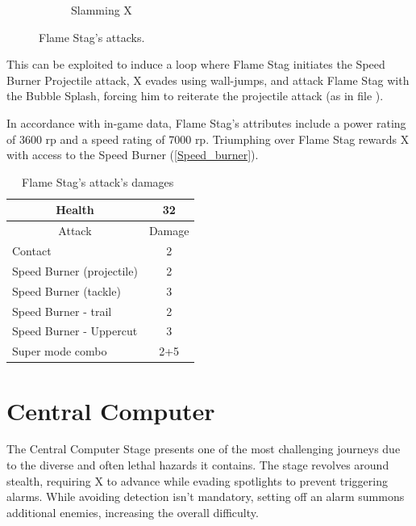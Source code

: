 \begin{figure}
\begin{subfigure}{0.25\linewidth}
		\caption{Slamming X}
	\end{subfigure}
	\caption{Flame Stag's attacks.}
\end{figure}This can be exploited to induce a loop where Flame Stag initiates the Speed Burner Projectile attack, X evades using wall-jumps, and attack Flame Stag with the Bubble Splash, forcing him to reiterate the projectile attack (as in file ).

In accordance with in-game data, Flame Stag's attributes include a power rating of 3600 rp and a speed rating of 7000 rp. Triumphing over Flame Stag rewards X with access to the Speed Burner (\ref{Speed_burner}).

\begin{table}[htp]
	\centering
	\begin{tabular}[h]{l c}
		
		\toprule
		\multicolumn{1}{c}{Health}  & 32 \\
		\midrule
		\multicolumn{1}{c}{Attack} & \multicolumn{1}{c}{Damage}\\
		Contact & 2 \\
		Speed Burner (projectile)& 2\\
		Speed Burner (tackle)& 3\\
		Speed Burner - trail& 2\\
		Speed Burner - Uppercut& 3\\
		Super mode combo & 2+5\\
		\bottomrule
	\end{tabular}
	\caption{Flame Stag's attack's damages~\cite{wiki:Flame_stag,book:Compendium}}
\end{table}

\section{Central Computer}
The Central Computer Stage presents one of the most challenging journeys due to the diverse and often lethal hazards it contains. The stage revolves around stealth, requiring X to advance while evading spotlights to prevent triggering alarms. While avoiding detection isn't mandatory, setting off an alarm summons additional enemies, increasing the overall difficulty.

